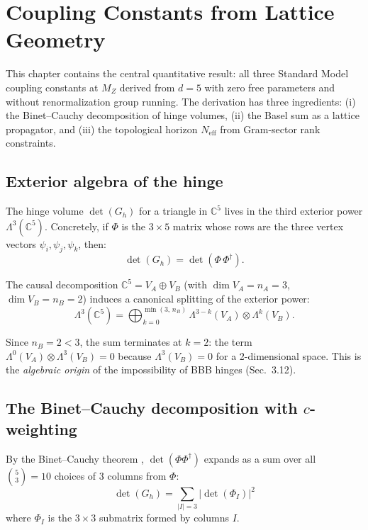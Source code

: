 \section{Coupling Constants from Lattice Geometry}
\label{ch:couplings}

This chapter contains the central quantitative result: all three Standard Model coupling constants at $M_Z$ derived from $d = 5$ with zero free parameters and without renormalization group running. The derivation has three ingredients: (i) the Binet--Cauchy decomposition of hinge volumes, (ii) the Basel sum as a lattice propagator, and (iii) the topological horizon $N_\text{eff}$ from Gram-sector rank constraints.

\subsection{Exterior algebra of the hinge}

The hinge volume $\det(G_h)$ for a triangle in $\mathbb{C}^5$ lives in the third exterior power $\Lambda^3(\mathbb{C}^5)$. Concretely, if $\Phi$ is the $3 \times 5$ matrix whose rows are the three vertex vectors $\psi_i, \psi_j, \psi_k$, then:
\begin{equation}
\det(G_h) = \det(\Phi\,\Phi^\dagger).
\end{equation}

The causal decomposition $\mathbb{C}^5 = V_A \oplus V_B$ (with $\dim V_A = n_A = 3$, $\dim V_B = n_B = 2$) induces a canonical splitting of the exterior power:
\begin{equation}
\Lambda^3(\mathbb{C}^5) = \bigoplus_{k=0}^{\min(3,\,n_B)} \Lambda^{3-k}(V_A) \otimes \Lambda^k(V_B).
\label{eq:exterior_split}
\end{equation}

Since $n_B = 2 < 3$, the sum terminates at $k = 2$: the term $\Lambda^0(V_A) \otimes \Lambda^3(V_B) = 0$ because $\Lambda^3(V_B) = 0$ for a 2-dimensional space. This is the \emph{algebraic origin} of the impossibility of BBB hinges (Sec.~3.12).

\subsection{The Binet--Cauchy decomposition with $c$-weighting}

By the Binet--Cauchy theorem \cite{BinetCauchy}, $\det(\Phi\Phi^\dagger)$ expands as a sum over all $\binom{5}{3} = 10$ choices of 3 columns from $\Phi$:
\begin{equation}
\det(G_h) = \sum_{|I| = 3} |\det(\Phi_I)|^2
\end{equation}
where $\Phi_I$ is the $3 \times 3$ submatrix formed by columns $I$.

